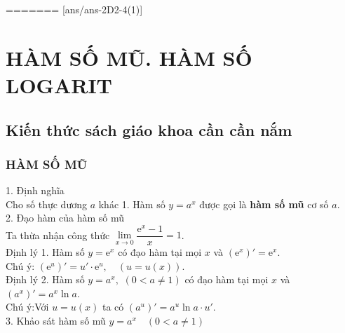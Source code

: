 =======
[ans/ans-2D2-4(1)]
\section{HÀM SỐ MŨ. HÀM SỐ LOGARIT}
\subsection{Kiến thức sách giáo khoa cần cần nắm}
\subsubsection{HÀM SỐ MŨ}
1. Định nghĩa\\
Cho số thực dương $a$ khác 1.
Hàm số $y=a^x$ được gọi là \textbf{hàm số mũ} cơ số $a$.\\
2. Đạo hàm của hàm số mũ\\
Ta thừa nhận công thức \quad $\lim\limits_{x\to 0}\dfrac{\mathrm{e}^x-1}{x}=1$.\\
Định lý 1.
Hàm số $y=\mathrm{e}^x$ có đạo hàm tại mọi $x$ và $(\mathrm{e}^x)'=\mathrm{e}^x$.\\
Chú ý: $(\mathrm{e}^u)'=u'\cdot\mathrm{e}^u, \quad (u=u(x))$.\\
Định lý 2.
Hàm số $y=a^x,\,\,(0<a\neq 1)$ có đạo hàm tại mọi $x$ và $(a^x)'=a^x\ln a$.\\
Chú ý:\quad Với $u=u(x)$ ta có $(a^u)'=a^u \ln a\cdot u'$.\\
3. Khảo sát hàm số mũ \quad $y=a^x \quad (0<a \ne 1)$
